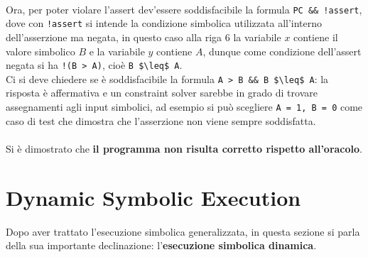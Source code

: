 \documentclass[a4paper, 12pt, oneside]{book}
\theoremstyle{normal}
\begin{document}
\noindent \\ Ora, per poter violare l'assert dev'essere soddisfacibile la formula \verb|PC && !assert|, dove con \verb|!assert| si intende la condizione simbolica utilizzata all'interno dell'asserzione ma negata, in questo caso alla riga 6 la variabile $x$ contiene il valore simbolico $B$ e la variabile $y$ contiene $A$, dunque come condizione dell'assert negata si ha \verb|!(B > A)|, cioè \lstinline|B $\leq$ A|. \\ Ci si deve chiedere se è soddisfacibile la formula \lstinline|A > B && B $\leq$ A|: la risposta è affermativa e un constraint solver sarebbe in grado di trovare assegnamenti agli input simbolici, ad esempio si può scegliere \verb|A = 1, B = 0| come caso di test che dimostra che l'asserzione non viene sempre soddisfatta. 
\\ \\ Si è dimostrato che \textbf{il programma non risulta corretto rispetto all'oracolo}.

\clearpage

\section{Dynamic Symbolic Execution}\label{section:dse}
Dopo aver trattato l'esecuzione simbolica generalizzata, in questa sezione si parla della sua importante declinazione: l'\textbf{esecuzione simbolica dinamica}.
\end{document}
